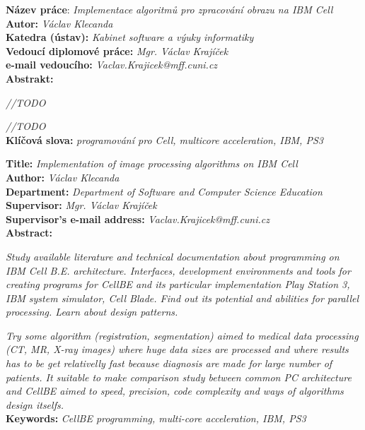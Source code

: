 \raggedbottom


\noindent
\textbf{Název práce}: \textit{Implementace algoritmů pro zpracování obrazu na IBM Cell} \\
\textbf{Autor:} \textit{Václav Klecanda} \\
\textbf{Katedra (ústav):} \textit{Kabinet software a výuky informatiky} \\
\textbf{Vedoucí diplomové práce:} \textit{Mgr. Václav Krajíček} \\
\textbf{e-mail vedoucího:} \textit{Vaclav.Krajicek@mff.cuni.cz} \\
\textbf{Abstrakt:} \\

\par
\textit{
//TODO
}

\par
\textit{
//TODO
}\\

\noindent
\textbf{Klíčová slova:} \textit{programování pro Cell, multicore acceleration, IBM, PS3} \\

\pagebreak


\noindent
\textbf{Title:} \textit{Implementation of image processing algorithms on IBM Cell} \\
\textbf{Author:} \textit{Václav Klecanda} \\
\textbf{Department:} \textit{Department of Software and Computer Science Education} \\
\textbf{Supervisor:} \textit{Mgr. Václav Krajíček} \\
\textbf{Supervisor's e-mail address:} \textit{Vaclav.Krajicek@mff.cuni.cz} \\
\textbf{Abstract:} \\

\par
\textit{
Study available literature and technical documentation about programming on IBM Cell B.E. architecture.
Interfaces, development environments and tools for creating programs for CellBE and its particular implementation Play Station 3, IBM system simulator, Cell Blade.
Find out its potential and abilities for parallel processing. Learn about design patterns.
}

\par
\textit{
Try some algorithm (registration, segmentation) aimed to medical data processing (CT, MR, X-ray images) where huge data sizes are processed and where results has to be get relativelly fast because diagnosis are made for large number of patients.
It suitable to make comparison study between common PC architecture and CellBE aimed to speed, precision, code complexity and ways of algorithms design itselfs.
}\\

\noindent
\textbf{Keywords:} \textit{CellBE programming, multi-core acceleration, IBM, PS3} \\

\pagebreak
